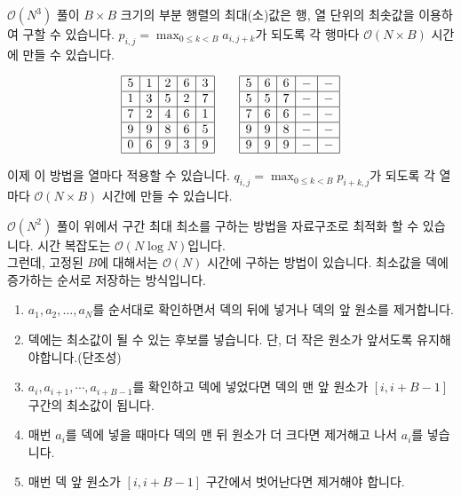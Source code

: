 \begin{frame}{$\mathcal{O}(N^3)$ 풀이}
\small
$B \times B$ 크기의 부분 행렬의 최대(소)값은 행, 열 단위의 최솟값을 이용하여 구할 수 있습니다.
$p_{i,j} = \max_{0 \le k < B} a_{i, j+k}$가 되도록 각 행마다 $\mathcal{O}(N \times B)$ 시간에 만들 수 있습니다.

\[
\begin{array}{|c|c|c|c|c|}
\hline
5 & 1 & 2 & 6 & 3 \\ \hline
1 & 3 & 5 & 2 & 7 \\ \hline
7 & 2 & 4 & 6 & 1 \\ \hline
9 & 9 & 8 & 6 & 5 \\ \hline
0 & 6 & 9 & 3 & 9 \\ \hline
\end{array}
\qquad
\begin{array}{|c|c|c|c|c|}
\hline
5 & 6 & 6 & - & - \\ \hline
5 & 5 & 7 & - & - \\ \hline
7 & 6 & 6 & - & - \\ \hline
9 & 9 & 8 & - & - \\ \hline
9 & 9 & 9 & - & - \\ \hline
\end{array}
\]

이제 이 방법을 열마다 적용할 수 있습니다. $q_{i, j} = \max_{0 \le k < B} p_{i+k, j}$가 되도록 각 열마다 $\mathcal{O}(N \times B)$ 시간에 만들 수 있습니다.
\end{frame}

\begin{frame}{$\mathcal{O}(N^2)$ 풀이}
\small
위에서 구간 최대 최소를 구하는 방법을 자료구조로 최적화 할 수 있습니다. 시간 복잡도는 $\mathcal{O}(N\log{N})$입니다.
\\

그런데, 고정된 $B$에 대해서는 $\mathcal{O}(N)$ 시간에 구하는 방법이 있습니다. 최소값을 덱에 증가하는 순서로 저장하는 방식입니다.

\begin{enumerate}
\item $a_1, a_2, \ldots, a_N$를 순서대로 확인하면서 덱의 뒤에 넣거나 덱의 앞 원소를 제거합니다.
\item 덱에는 최소값이 될 수 있는 후보를 넣습니다. 단, 더 작은 원소가 앞서도록 유지해야합니다.(단조성)
\item $a_i, a_{i + 1}, \cdots, a_{i + B - 1}$를 확인하고 덱에 넣었다면 덱의 맨 앞 원소가 $[i, i + B - 1]$ 구간의 최소값이 됩니다.
\item 매번 $a_i$를 덱에 넣을 때마다 덱의 맨 뒤 원소가 더 크다면 제거해고 나서 $a_i$를 넣습니다.
\item 매번 덱 앞 원소가 $[i, i + B - 1]$ 구간에서 벗어난다면 제거해야 합니다.
\end{enumerate}

\end{frame}

